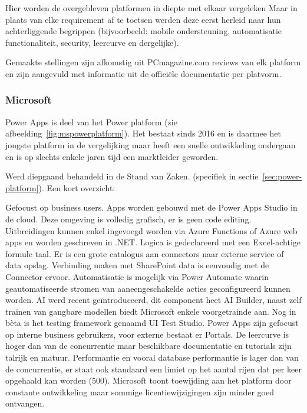
Hier worden de overgebleven platformen in diepte met elkaar vergeleken Maar in plaats van elke requirement af te toetsen werden deze eerst herleid naar hun achterliggende begrippen (bijvoorbeeld: mobile ondersteuning, automatisatie functionaliteit, security, leercurve en dergelijke).

Gemaakte stellingen zijn afkomstig uit PCmagazine.com reviews van elk platform en zijn aangevuld met informatie uit de officiële documentatie per platvorm.

\subsubsection{Microsoft}

Power Apps is deel van het Power platform (zie afbeelding~\ref{fig:mspowerplatform}). Het bestaat sinds 2016 en is daarmee het jongste platform in de vergelijking maar heeft een snelle ontwikkeling ondergaan en is op slechts enkele jaren tijd een marktleider geworden.

Werd diepgaand behandeld in de Stand van Zaken. (specifiek in sectie~\ref{sec:power-platform}). Een kort overzicht:

Gefocust op business users.
Apps worden gebouwd met de Power Apps Studio in de cloud. Deze omgeving is volledig grafisch, er is geen code editing. Uitbreidingen kunnen enkel ingevoegd worden via Azure Functions of Azure web apps en worden geschreven in .NET. Logica is gedeclareerd met een Excel-achtige formule taal. Er is een grote catalogus aan connectors naar externe service of data opslag. Verbinding maken met SharePoint data is eenvoudig met de Connector ervoor. Automatisatie is mogelijk via Power Automate waarin geautomatiseerde stromen van aaneengeschakelde acties geconfigureerd kunnen worden. AI werd recent geïntroduceerd, dit component heet AI Builder, naast zelf trainen van gangbare modellen biedt Microsoft enkele voorgetrainde aan. Nog in bèta is het testing framework genaamd UI Test Studio. Power Apps zijn gefocust op interne business gebruikers, voor externe bestaat er Portals. De leercurve is hoger dan van de concurrentie maar beschikbare documentatie en tutorials zijn talrijk en matuur. Performantie en vooral database performantie is lager dan van de concurrentie, er staat ook standaard een limiet op het aantal rijen dat per keer opgehaald kan worden (500). Microsoft toont toewijding aan het platform door constante ontwikkeling maar sommige licentiewijzigingen zijn minder goed ontvangen.

